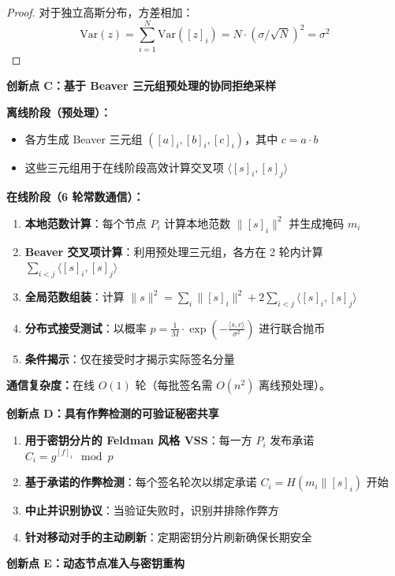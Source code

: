 \begin{proof}
对于独立高斯分布，方差相加：
$$\text{Var}(z) = \sum_{i=1}^{N} \text{Var}([z]_i) = N \cdot (\sigma/\sqrt{N})^2 = \sigma^2$$
\end{proof}

\textbf{创新点 C：基于 Beaver 三元组预处理的协同拒绝采样}

\textbf{离线阶段（预处理）：}
\begin{itemize}
    \item 各方生成 Beaver 三元组 $([a]_i, [b]_i, [c]_i)$，其中 $c = a \cdot b$
    \item 这些三元组用于在线阶段高效计算交叉项 $\langle [s]_i, [s]_j \rangle$
\end{itemize}

\textbf{在线阶段（6 轮常数通信）：}
\begin{enumerate}
    \item \textbf{本地范数计算}：每个节点 $P_i$ 计算本地范数 $\|[s]_i\|^2$ 并生成掩码 $m_i$
    \item \textbf{Beaver 交叉项计算}：利用预处理三元组，各方在 2 轮内计算 $\sum_{i<j} \langle [s]_i, [s]_j \rangle$
    \item \textbf{全局范数组装}：计算 $\|s\|^2 = \sum_i \|[s]_i\|^2 + 2\sum_{i<j} \langle [s]_i, [s]_j \rangle$
    \item \textbf{分布式接受测试}：以概率 $p = \frac{1}{M} \cdot \exp\left(-\frac{\langle s, c \rangle}{\sigma^2}\right)$ 进行联合抛币
    \item \textbf{条件揭示}：仅在接受时才揭示实际签名分量
\end{enumerate}

\textbf{通信复杂度：}在线 $O(1)$ 轮（每批签名需 $O(n^2)$ 离线预处理）。

\textbf{创新点 D：具有作弊检测的可验证秘密共享}

\begin{enumerate}
    \item \textbf{用于密钥分片的 Feldman 风格 VSS}：每一方 $P_i$ 发布承诺 $C_i = g^{[f]_i} \mod p$
    \item \textbf{基于承诺的作弊检测}：每个签名轮次以绑定承诺 $C_i = H(m_i \| [s]_i)$ 开始
    \item \textbf{中止并识别协议}：当验证失败时，识别并排除作弊方
    \item \textbf{针对移动对手的主动刷新}：定期密钥分片刷新确保长期安全
\end{enumerate}

\textbf{创新点 E：动态节点准入与密钥重构}

